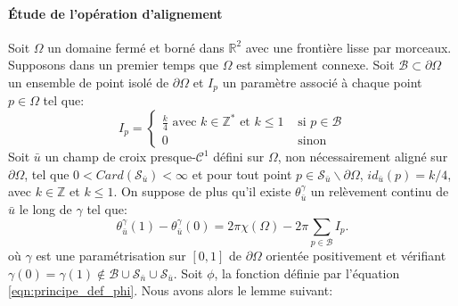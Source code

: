 \paragraph{\'Etude de l'opération d'alignement}

Soit $\Omega$ un domaine fermé et borné dans $\mathbb{R}^2$ avec une frontière lisse par morceaux. Supposons dans un premier temps que $\Omega$ est simplement connexe. Soit $\mathcal{B}\subset\partial\Omega$ un ensemble de point isolé de $\partial\Omega$ et $I_p$ un paramètre associé à chaque point $p\in\Omega$ tel que:
\begin{equation}
I_p=
\left\{
\begin{array}{ll}
\displaystyle\frac{k}{4}\mbox{ avec }k\in\mathbb{Z}^*\mbox{ et }k\leq 1& \mbox{ si } p\in\mathcal{B}\\[0.5cm]
0& \mbox{ sinon }
\end{array}
\right.
\label{eqn:etude_def_I}
\end{equation}
Soit $\bar{u}$ un champ de croix presque-$\mathcal{C}^1$ défini sur $\Omega$, non nécessairement aligné sur $\partial\Omega$, tel que $0<Card(\mathcal{S}_{\bar{u}})<\infty$ et pour tout point $p\in\mathcal{S}_{\bar{u}}\backslash\partial\Omega$, $id_{\bar{u}}(p)=k/4$, avec $k\in\mathbb{Z}$ et $k\leq 1$. On suppose de plus qu'il existe $\theta_{\bar{u}}^\gamma$ un relèvement continu de $\bar{u}$ le long de $\gamma$ tel que:
\begin{equation}
    \label{eqn:etude_hypothese_u}
    \theta_{\bar{u}}^\gamma(1)-\theta_{\bar{u}}^\gamma(0)=2\pi\chi(\Omega)-2\pi\sum_{p\in\mathcal{B}}I_p.
\end{equation}
où $\gamma$ est une paramétrisation sur $[0, 1]$ de $\partial\Omega$ orientée positivement et vérifiant $\gamma(0)=\gamma(1)\notin\mathcal{B}\cup\mathcal{S}_{\bar{n}}\cup\mathcal{S}_{\bar{u}}$.
Soit $\phi$, la fonction définie par l'équation \eqref{eqn:principe_def_phi}. Nous avons alors le lemme suivant:

